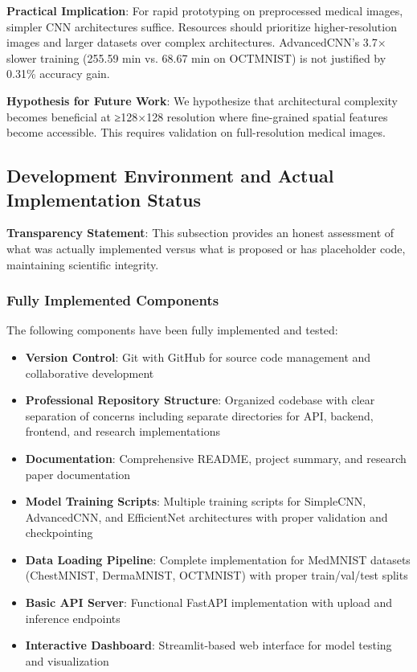 \documentclass[12pt,a4paper]{article}
\begin{document}
\textbf{Practical Implication}: For rapid prototyping on preprocessed medical images, simpler CNN architectures suffice. Resources should prioritize higher-resolution images and larger datasets over complex architectures. AdvancedCNN's 3.7× slower training (255.59 min vs. 68.67 min on OCTMNIST) is not justified by 0.31\% accuracy gain.

\textbf{Hypothesis for Future Work}: We hypothesize that architectural complexity becomes beneficial at ≥128×128 resolution where fine-grained spatial features become accessible. This requires validation on full-resolution medical images.

\subsection{Development Environment and Actual Implementation Status}

\textbf{Transparency Statement}: This subsection provides an honest assessment of what was actually implemented versus what is proposed or has placeholder code, maintaining scientific integrity.

\subsubsection{Fully Implemented Components}

The following components have been fully implemented and tested:

\begin{itemize}
    \item \textbf{Version Control}: Git with GitHub for source code management and collaborative development
    \item \textbf{Professional Repository Structure}: Organized codebase with clear separation of concerns including separate directories for API, backend, frontend, and research implementations
    \item \textbf{Documentation}: Comprehensive README, project summary, and research paper documentation
    \item \textbf{Model Training Scripts}: Multiple training scripts for SimpleCNN, AdvancedCNN, and EfficientNet architectures with proper validation and checkpointing
    \item \textbf{Data Loading Pipeline}: Complete implementation for MedMNIST datasets (ChestMNIST, DermaMNIST, OCTMNIST) with proper train/val/test splits
    \item \textbf{Basic API Server}: Functional FastAPI implementation with upload and inference endpoints
    \item \textbf{Interactive Dashboard}: Streamlit-based web interface for model testing and visualization
\end{itemize}
\end{document}
